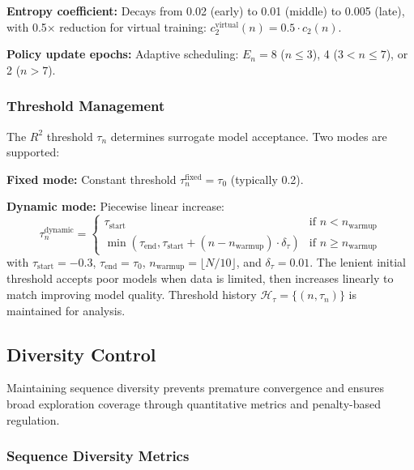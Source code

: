\documentclass[conference]{IEEEtran}
\begin{document}
\textbf{Entropy coefficient:} Decays from 0.02 (early) to 0.01 (middle) to 0.005 (late), with 0.5× reduction for virtual training: $c_2^{\text{virtual}}(n) = 0.5 \cdot c_2(n)$.

\textbf{Policy update epochs:} Adaptive scheduling: $E_n = 8$ ($n \leq 3$), 4 ($3 < n \leq 7$), or 2 ($n > 7$).

\subsubsection{Threshold Management}

The $R^2$ threshold $\tau_n$ determines surrogate model acceptance. Two modes are supported:

\textbf{Fixed mode:} Constant threshold $\tau_n^{\text{fixed}} = \tau_0$ (typically 0.2).

\textbf{Dynamic mode:} Piecewise linear increase:
%
\begin{equation}
\tau_n^{\text{dynamic}} = \begin{cases}
\tau_{\text{start}} & \text{if } n < n_{\text{warmup}} \\
\min\left(\tau_{\text{end}}, \tau_{\text{start}} + (n - n_{\text{warmup}}) \cdot \delta_{\tau}\right) & \text{if } n \geq n_{\text{warmup}}
\end{cases}
\end{equation}
%
with $\tau_{\text{start}} = -0.3$, $\tau_{\text{end}} = \tau_0$, $n_{\text{warmup}} = \lfloor N/10 \rfloor$, and $\delta_{\tau} = 0.01$. The lenient initial threshold accepts poor models when data is limited, then increases linearly to match improving model quality. Threshold history $\mathcal{H}_{\tau} = \{(n, \tau_n)\}$ is maintained for analysis.







\subsection{Diversity Control}

Maintaining sequence diversity prevents premature convergence and ensures broad exploration coverage through quantitative metrics and penalty-based regulation.

\subsubsection{Sequence Diversity Metrics}
\end{document}
